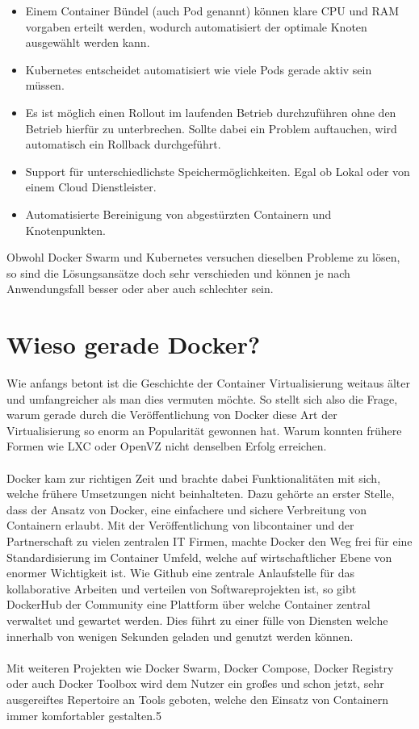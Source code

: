 \documentclass[12pt,toc=bib,toc=listof]{scrreprt}
\begin{document}
\begin{itemize}
	\item Einem Container Bündel (auch Pod genannt) können klare CPU und RAM vorgaben erteilt werden, wodurch automatisiert der optimale Knoten ausgewählt werden kann.
	\item Kubernetes entscheidet automatisiert wie viele Pods gerade aktiv sein müssen.\\
	\item Es ist möglich einen Rollout im laufenden Betrieb durchzuführen ohne den Betrieb hierfür zu unterbrechen. Sollte dabei ein Problem auftauchen, wird automatisch ein Rollback durchgeführt.
	\item Support für unterschiedlichste Speichermöglichkeiten. Egal ob Lokal oder von einem Cloud Dienstleister.
	\item Automatisierte Bereinigung von abgestürzten Containern und Knotenpunkten.
\end{itemize}
Obwohl Docker Swarm und Kubernetes versuchen dieselben Probleme zu lösen, so sind die Lösungsansätze doch sehr verschieden und können je nach Anwendungsfall besser oder aber auch schlechter sein.

\section{Wieso gerade Docker?}
Wie anfangs betont ist die Geschichte der Container Virtualisierung weitaus älter und umfangreicher als man dies vermuten möchte.
So stellt sich also die Frage, warum gerade durch die Veröffentlichung von Docker diese Art der Virtualisierung so enorm an Popularität gewonnen hat.
Warum konnten frühere Formen wie LXC oder OpenVZ nicht denselben Erfolg erreichen.\\
\\
Docker kam zur richtigen Zeit und brachte dabei Funktionalitäten mit sich, welche frühere Umsetzungen nicht beinhalteten.
Dazu gehörte an erster Stelle, dass der Ansatz von Docker, eine einfachere und sichere Verbreitung von Containern erlaubt.
Mit der Veröffentlichung von libcontainer und der Partnerschaft zu vielen zentralen IT Firmen, machte Docker den Weg frei für eine Standardisierung im Container Umfeld, welche auf wirtschaftlicher Ebene von enormer Wichtigkeit ist.
Wie Github eine zentrale Anlaufstelle für das kollaborative Arbeiten und verteilen von Softwareprojekten ist, so gibt DockerHub der Community eine Plattform über welche Container zentral verwaltet und gewartet werden.
Dies führt zu einer fülle von Diensten welche innerhalb von wenigen Sekunden geladen und genutzt werden können.\\
\\
Mit weiteren Projekten wie Docker Swarm, Docker Compose, Docker Registry oder auch Docker Toolbox wird dem Nutzer ein großes und schon jetzt, sehr ausgereiftes Repertoire an Tools geboten, welche den Einsatz von Containern immer komfortabler gestalten.5
\end{document}
